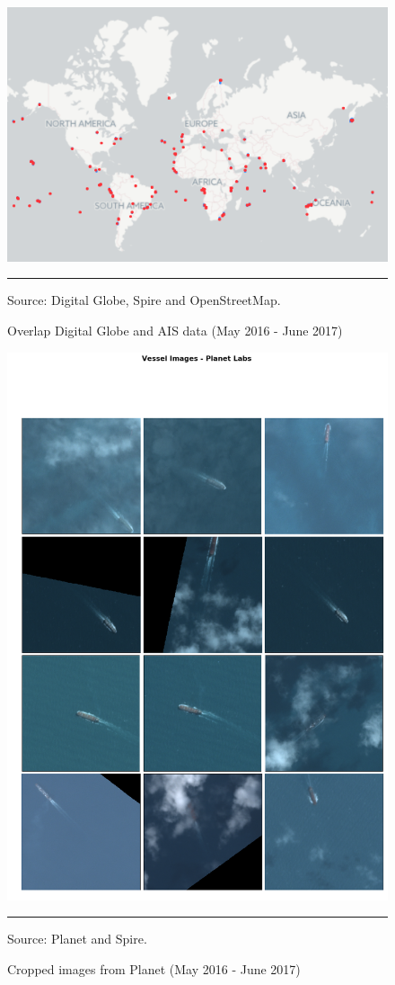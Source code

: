 \begin{figure}[H]
	\centering \caption{Overlap Digital Globe and AIS data (May 2016 - June 2017)}\label{overlap}
\includegraphics[width=0.6\linewidth]{images/overlap_gbdx.png} 
\begin{flushleft}
\rule{1.2in}{0em} \scriptsize Source: Digital Globe, Spire and OpenStreetMap. \\
\par
\end{flushleft}
\end{figure}

\begin{figure}[H]
	\centering \caption{Cropped images from Planet (May 2016 - June 2017)}\label{mosaic}
	\includegraphics[trim={0 0 0 2cm},width=0.6\linewidth]{images/mosaic_planet_torres_strait.png} 
\begin{flushleft}
\rule{1.2in}{0em} \scriptsize Source: Planet and Spire. \\
\par
\end{flushleft}
\end{figure}


